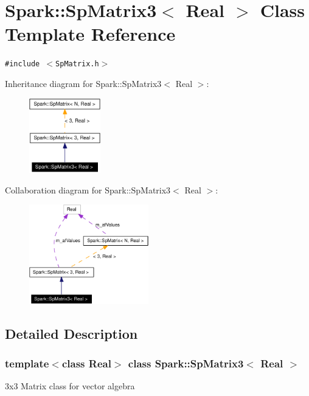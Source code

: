 \section{Spark::Sp\-Matrix3$<$ Real $>$ Class Template Reference}
\label{classSpark_1_1SpMatrix3}
{\tt \#include $<$Sp\-Matrix.h$>$}

Inheritance diagram for Spark::Sp\-Matrix3$<$ Real $>$:\begin{figure}[H]
\begin{center}
\leavevmode
\includegraphics[width=88pt]{classSpark_1_1SpMatrix3__inherit__graph}
\end{center}
\end{figure}
Collaboration diagram for Spark::Sp\-Matrix3$<$ Real $>$:\begin{figure}[H]
\begin{center}
\leavevmode
\includegraphics[width=147pt]{classSpark_1_1SpMatrix3__coll__graph}
\end{center}
\end{figure}


\subsection{Detailed Description}
\subsubsection*{template$<$class Real$>$ class Spark::Sp\-Matrix3$<$ Real $>$}

3x3 Matrix class for vector algebra 

